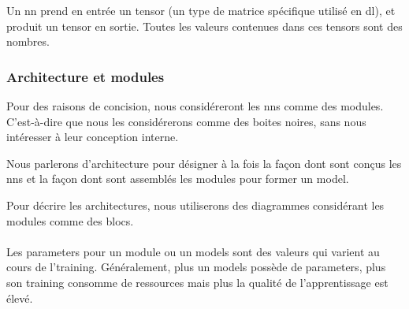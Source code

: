 Un \gls{nn} prend en entrée un \gls{tensor} (un type de \gls{matrice} spécifique utilisé en \gls{dl}), et produit un \gls{tensor} en sortie.
Toutes les valeurs contenues dans ces \glspl{tensor} sont des nombres.


\subsubsection{Architecture et modules} \label{def:module} \label{def:architecture}
Pour des raisons de concision, nous considéreront les \glspl{nn} comme des \glspl{module}. C'est-à-dire que nous les considérerons comme des boites noires,
sans nous intéresser à leur conception interne.

Nous parlerons d'\gls{architecture} pour désigner à la fois la façon dont sont conçus les \glspl{nn} et la façon dont sont assemblés les \glspl{module} pour former un \gls{model}.

Pour décrire les \glspl{architecture}, nous utiliserons des diagrammes considérant les \glspl{module} comme des blocs.

\paragraph{} \label{def:parameter}
Les \glspl{parameter} pour un \gls{module} ou un \glspl{model} sont des valeurs qui varient au cours de l'\gls{training}. Généralement, plus un \glspl{model} possède de \glspl{parameter}, plus son \gls{training} consomme de ressources mais plus la qualité de l'apprentissage est élevé.

%

